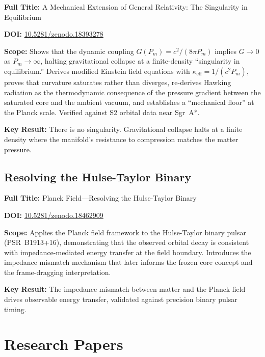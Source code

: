 \documentclass[11pt,a4paper]{article}
\begin{document}
\textbf{Full Title:} A Mechanical Extension of General Relativity: The Singularity in Equilibrium

\textbf{DOI:} \href{https://doi.org/10.5281/zenodo.18393278}{10.5281/zenodo.18393278}

\textbf{Scope:} Shows that the dynamic coupling $G(P_m) = c^2/(8\pi P_m)$ implies $G \to 0$ as $P_m \to \infty$, halting gravitational collapse at a finite-density ``singularity in equilibrium.'' Derives modified Einstein field equations with $\kappa_{\mathrm{eff}} = 1/(c^2 P_m)$, proves that curvature saturates rather than diverges, re-derives Hawking radiation as the thermodynamic consequence of the pressure gradient between the saturated core and the ambient vacuum, and establishes a ``mechanical floor'' at the Planck scale. Verified against S2 orbital data near Sgr~A*.

\textbf{Key Result:} There is no singularity. Gravitational collapse halts at a finite density where the manifold's resistance to compression matches the matter pressure.

\subsection{Resolving the Hulse-Taylor Binary}
\label{sec:foundation_hulse_taylor}

\textbf{Full Title:} Planck Field---Resolving the Hulse-Taylor Binary

\textbf{DOI:} \href{https://doi.org/10.5281/zenodo.18462909}{10.5281/zenodo.18462909}

\textbf{Scope:} Applies the Planck field framework to the Hulse-Taylor binary pulsar (PSR~B1913+16), demonstrating that the observed orbital decay is consistent with impedance-mediated energy transfer at the field boundary. Introduces the impedance mismatch mechanism that later informs the frozen core concept and the frame-dragging interpretation.

\textbf{Key Result:} The impedance mismatch between matter and the Planck field drives observable energy transfer, validated against precision binary pulsar timing.

\section{Research Papers}
\label{sec:research_papers}
\end{document}
